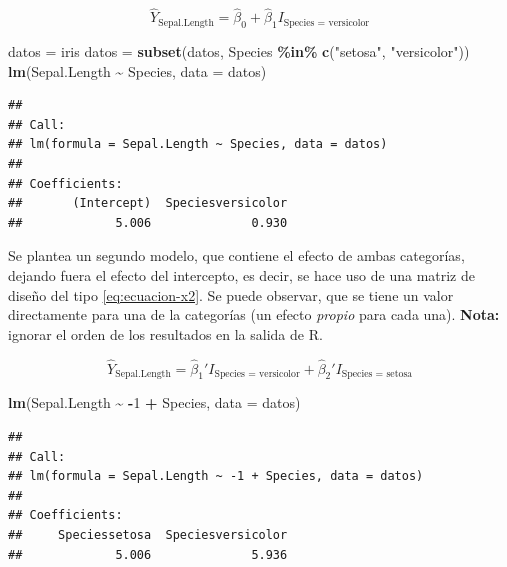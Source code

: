 \documentclass[
  11pt,
]{book}
\newenvironment{Shaded}{\begin{snugshade}}{\end{snugshade}}
\newcommand{\AttributeTok}[1]{\textcolor[rgb]{0.13,0.29,0.53}{#1}}
\newcommand{\DecValTok}[1]{\textcolor[rgb]{0.00,0.00,0.81}{#1}}
\newcommand{\FunctionTok}[1]{\textcolor[rgb]{0.13,0.29,0.53}{\textbf{#1}}}
\newcommand{\NormalTok}[1]{#1}
\newcommand{\OtherTok}[1]{\textcolor[rgb]{0.56,0.35,0.01}{#1}}
\newcommand{\SpecialCharTok}[1]{\textcolor[rgb]{0.81,0.36,0.00}{\textbf{#1}}}
\newcommand{\StringTok}[1]{\textcolor[rgb]{0.31,0.60,0.02}{#1}}
\theoremstyle{definition}
\theoremstyle{definition}
\theoremstyle{definition}
\theoremstyle{definition}
\theoremstyle{remark}
\begin{document}
\begin{equation}
\widehat{Y}_{\text{Sepal.Length}} = \widehat{\beta}_0 + \widehat{\beta}_1I_{\text{Species = versicolor}}
\label{eq:modelo-x1-ejemplo}
\end{equation}

\begin{Shaded}
\begin{Highlighting}[]
\NormalTok{datos }\OtherTok{=}\NormalTok{ iris}
\NormalTok{datos }\OtherTok{=} \FunctionTok{subset}\NormalTok{(datos, Species }\SpecialCharTok{\%in\%} \FunctionTok{c}\NormalTok{(}\StringTok{"setosa"}\NormalTok{, }\StringTok{"versicolor"}\NormalTok{))}
\FunctionTok{lm}\NormalTok{(Sepal.Length }\SpecialCharTok{\textasciitilde{}}\NormalTok{ Species, }\AttributeTok{data =}\NormalTok{ datos)}
\end{Highlighting}
\end{Shaded}

\begin{verbatim}
## 
## Call:
## lm(formula = Sepal.Length ~ Species, data = datos)
## 
## Coefficients:
##       (Intercept)  Speciesversicolor  
##             5.006              0.930
\end{verbatim}

Se plantea un segundo modelo, que contiene el efecto de ambas categorías, dejando fuera el efecto del intercepto, es decir, se hace uso de una matriz de diseño del tipo \eqref{eq:ecuacion-x2}. Se puede observar, que se tiene un valor directamente para una de la categorías (un efecto \emph{propio} para cada una). \textbf{Nota:} ignorar el orden de los resultados en la salida de R.

\begin{equation}
\widehat{Y}_{\text{Sepal.Length}} = \widehat{\beta}_1'I_{\text{Species = versicolor}} +  \widehat{\beta}_2'I_{\text{Species = setosa}}
\label{eq:modelo-x2-ejemplo}
\end{equation}

\begin{Shaded}
\begin{Highlighting}[]
\FunctionTok{lm}\NormalTok{(Sepal.Length }\SpecialCharTok{\textasciitilde{}} \SpecialCharTok{{-}}\DecValTok{1} \SpecialCharTok{+}\NormalTok{ Species, }\AttributeTok{data =}\NormalTok{ datos)}
\end{Highlighting}
\end{Shaded}

\begin{verbatim}
## 
## Call:
## lm(formula = Sepal.Length ~ -1 + Species, data = datos)
## 
## Coefficients:
##     Speciessetosa  Speciesversicolor  
##             5.006              5.936
\end{verbatim}
\end{document}
